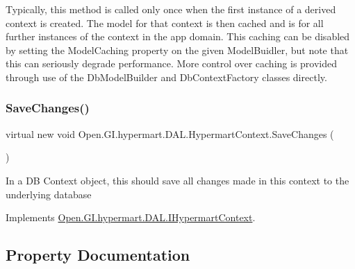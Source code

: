Typically, this method is called only once when the first instance of a derived context is created. The model for that context is then cached and is for all further instances of the context in the app domain. This caching can be disabled by setting the Model\+Caching property on the given Model\+Buidler, but note that this can seriously degrade performance. More control over caching is provided through use of the Db\+Model\+Builder and Db\+Context\+Factory classes directly. \hypertarget{class_open_1_1_g_i_1_1hypermart_1_1_d_a_l_1_1_hypermart_context_a53edb75fbc2507fc97eaf26e36d92f42}{}\label{class_open_1_1_g_i_1_1hypermart_1_1_d_a_l_1_1_hypermart_context_a53edb75fbc2507fc97eaf26e36d92f42} 
\subsubsection{\texorpdfstring{Save\+Changes()}{SaveChanges()}}
{\footnotesize\ttfamily virtual new void Open.\+G\+I.\+hypermart.\+D\+A\+L.\+Hypermart\+Context.\+Save\+Changes (\begin{DoxyParamCaption}{ }\end{DoxyParamCaption})\hspace{0.3cm}{\ttfamily [virtual]}}



In a DB Context object, this should save all changes made in this context to the underlying database 



Implements \hyperlink{interface_open_1_1_g_i_1_1hypermart_1_1_d_a_l_1_1_i_hypermart_context_aacc5015260d97950f2a10d7673873304}{Open.\+G\+I.\+hypermart.\+D\+A\+L.\+I\+Hypermart\+Context}.



\subsection{Property Documentation}
\hypertarget{class_open_1_1_g_i_1_1hypermart_1_1_d_a_l_1_1_hypermart_context_a07b9fbba8f80cd3c629d2372d9d4d5c6}{}\label{class_open_1_1_g_i_1_1hypermart_1_1_d_a_l_1_1_hypermart_context_a07b9fbba8f80cd3c629d2372d9d4d5c6} 
